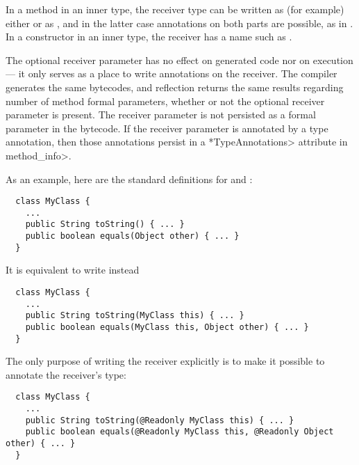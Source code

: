\documentclass[10pt]{article}
\newcommand{\preverbnegspace}{\vspace{-5pt}}
\begin{document}
\begin{enumerate}



  In a method in an inner type,
  the receiver type can be
  written as (for example) either  or as ,
  and in the latter case annotations on both parts are possible, as in
  .
  In a constructor in an inner type, the receiver
  has a name such as .

  The optional receiver parameter has no effect on generated code nor on
  execution --- it only
  serves as a place to write annotations on the receiver.  The compiler
  generates the same bytecodes, and reflection returns the same results
  regarding number of method formal parameters, whether or not the optional
  receiver parameter is present.  The receiver
  parameter is not persisted as a formal parameter in the bytecode.
  If the receiver parameter is annotated by
  a type annotation, then those annotations persist in a 
  \<*TypeAnnotations> attribute in \<method\_info>.


  As an example, here are the standard definitions for  and :
\preverbnegspace
\begin{Verbatim}
  class MyClass {
    ...
    public String toString() { ... }
    public boolean equals(Object other) { ... }
  }
\end{Verbatim}

\noindent
It is equivalent to write instead

\preverbnegspace
\begin{Verbatim}
  class MyClass {
    ...
    public String toString(MyClass this) { ... }
    public boolean equals(MyClass this, Object other) { ... }
  }
\end{Verbatim}

\noindent
The only purpose of writing the receiver explicitly is to make it
possible to annotate the receiver's type:

\preverbnegspace
\begin{Verbatim}
  class MyClass {
    ...
    public String toString(@Readonly MyClass this) { ... }
    public boolean equals(@Readonly MyClass this, @Readonly Object other) { ... }
  }
\end{Verbatim}


\end{enumerate}
\end{document}
